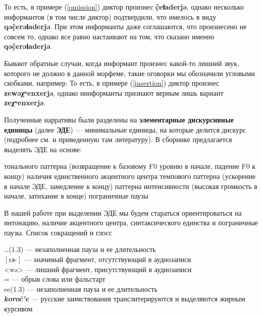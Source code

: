 То есть, в примере (\ref{omission}) диктор произнес \textbf{č̣eɬaderjə}, однако несколько информантов (в том числе диктор) подтвердили, что имелось в виду \textbf{qəč̣erəɬaderjə}. При этом информанты даже соглашаются, что произнесено не совсем то, однако все равно настаивают  на том, что сказано именно \textbf{qəč̣erəɬaderjə}.
\par Бывают обратные случаи, когда информант произнес какой-то лишний звук, которого не должно в данной морфеме, такие оговорки мы обозначили угловыми скобками, например:
То есть, в примере (\ref{insertion}) диктор произнес \textbf{zewəχʷenxerjə}, однако иинформанты признают верным лишь вариант \textbf{zeχʷenxerjə}.
\par Полученные нарративы были разделены на \textbf{элементарные дискурсивные единицы} (далее \textbf{ЭДЕ}) --- минимальные единицы, на которые делится дискурс (подробнее см. \cite[55--102]{kibrik14} и приведенную там литературу). В сборнике \cite[60]{kibrik14} предлагается выделять ЭДЕ на основе:
\begin{itemize}
\mytem тонального паттерна (возвращение к базовому F0 уровню в начале, падение F0 к концу)
\mytem наличия единственного акцентного центра
\mytem темпового паттерна (ускорение в начале ЭДЕ, замедление к концу)
\mytem паттерна интенсивности (высокая громкость в начале, затихание в конце)
\mytem пограничные паузы
\end{itemize}
В нашей работе при выделении ЭДЕ мы будем стараться ориентироваться на интонацию, наличие акцентного центра, синтаксического единства и пограничные паузы.
\vfill 
\pagebreak
\footnotesize
\noindent Список сокращений и глосс
\begin{multicols}{2}
\noindent …(1.3) --- незаполненная пауза и ее длительность\\
$\left[\mbox{rə-}\right]$ --- значимый фрагмент, отсутствующий в аудиозаписи\\
<wə> --- лишний фрагмент, присутствующий в аудиозаписи\\
 = --- обрыв слова или фальстарт\\
ee(1.3) --- незаполненная пауза и ее длительность\\
\textbf{\textit{koroč'e}} --- русские заимствования транслитерируются и выделяются жирным курсивом\\
\end{multicols}


\normalsize
